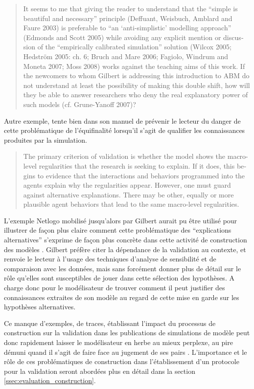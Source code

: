\foreignblockquote{english}[\cite{Manzo2007a}]{It seems to me that giving the reader to understand that the \enquote{simple is beautiful and necessary} principle (Deffuant, Weisbuch, Amblard and Faure 2003) is preferable to \enquote{an \enquote{anti-simplistic} modelling approach} (Edmonds and Scott 2005) while avoiding any explicit mention or discussion of the \enquote{empirically
calibrated simulation} solution (Wilcox 2005; Hedström 2005: ch. 6; Bruch and Mare 2006; Fagiolo, Windrum and Moneta 2007; Moss 2008) works against the teaching aims of this work. If the newcomers to whom Gilbert is addressing this introduction to ABM do not understand at least the possibility of making this double shift, how will they be able to answer researchers who deny the real explanatory power of such models (cf. Grune-Yanoff 2007)?}

Autre exemple, \textcite{Gilbert2008} tente bien dans son manuel de prévenir le lecteur du danger de cette problématique de l'équifinalité lorsqu'il s'agit de qualifier les connaissances produites par la simulation.

\foreignblockquote{english}[{\cite[31-32]{Gilbert2008}}]{The primary criterion of validation is whether the model shows the macro-level regularities that the research is seeking to explain. If it does, this begins to evidence that the interactions and behaviors programmed into the agents explain why the regularities appear. However, one must guard against alternative explanations. There may be other, equally or more plausible agent behaviors that lead to the same macro-level regularities.}

L'exemple Netlogo mobilisé jusqu'alors par Gilbert aurait pu être utilisé pour illustrer de façon plus claire comment cette problématique des \enquote{explications alternatives} s'exprime de façon plus concrète dans cette activité de construction des modèles . Gilbert préfère citer la dépendance de la validation au contexte, et renvoie le lecteur à l'usage des techniques d'analyse de sensibilité et de comparaison avec les données, mais sans forcément donner plus de détail sur le rôle qu'elles sont susceptibles de jouer dans cette sélection des hypothèses. A charge donc pour le modélisateur de trouver comment il peut justifier des connaissances extraites de son modèle au regard de cette mise en garde sur les hypothèses alternatives.

Ce manque d'exemples, de traces, établissant l'impact du processus de construction sur la validation dans les publications de simulations de modèle peut donc rapidement laisser le modélisateur en herbe au mieux perplexe, au pire démuni quand il s'agit de faire face au jugement de ses pairs \autocite{Manzo2007a}. L'importance et le rôle de ces problématiques de construction dans l'établissement d'un protocole pour la validation seront abordées plus en détail dans la section \ref{ssec:evaluation_construction}.

